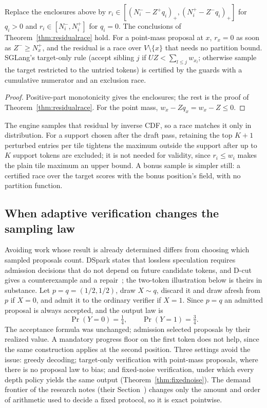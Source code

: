 \begin{theorem}\label{thm:residualself}
Replace the enclosures above by $r_i\in[(N^-_i-Z^+q_i)_+,(N^+_i-Z^-q_i)_+]$ for $q_i>0$ and $r_i\in[N_i^-,N_i^+]$ for $q_i=0$. The conclusions of Theorem~\ref{thm:residualrace} hold. For a point-mass proposal at $x$, $r_x=0$ as soon as $Z^-\ge N^+_x$, and the residual is a race over $V\setminus\{x\}$ that needs no partition bound. SGLang's target-only rule (accept sibling $j$ if $UZ<\sum_{l\le j}w_{x_l}$; otherwise sample the target restricted to the untried tokens) is certified by the guards with a cumulative numerator and an exclusion race.
\end{theorem}
\begin{proof}
Positive-part monotonicity gives the enclosures; the rest is the proof of Theorem~\ref{thm:residualrace}. For the point mass, $w_x-Zq_x=w_x-Z\le0$.
\end{proof}
The engine samples that residual by inverse CDF, so a race matches it only in distribution. For a support chosen after the draft pass, retaining the top $K+1$ perturbed entries per tile tightens the maximum outside the support after up to $K$ support tokens are excluded; it is not needed for validity, since $r_i\le w_i$ makes the plain tile maximum an upper bound. A bonus sample is simpler still: a certified race over the target scores with the bonus position's field, with no partition function.

\subsection{When adaptive verification changes the sampling law}\label{app:stopping}\label{sec:stopping}
Avoiding work whose result is already determined differs from choosing which sampled proposals count. DSpark states that lossless speculation requires admission decisions that do not depend on future candidate tokens, and D-cut gives a counterexample and a repair~\cite{dspark,dcut}; the two-token illustration below is theirs in substance. Let $p=q=(1/2,1/2)$, draw $X\sim q$, discard it and draw afresh from $p$ if $X=0$, and admit it to the ordinary verifier if $X=1$. Since $p=q$ an admitted proposal is always accepted, and the output law is
\begin{equation}
\Pr(Y=0)=\tfrac14,\qquad\Pr(Y=1)=\tfrac34.\label{eq:bias}
\end{equation}
The acceptance formula was unchanged; admission selected proposals by their realized value. A mandatory progress floor on the first token does not help, since the same construction applies at the second position. Three settings avoid the issue: greedy decoding; target-only verification with point-mass proposals, where there is no proposal law to bias; and fixed-noise verification, under which every depth policy yields the same output (Theorem~\ref{thm:fixednoise}). The demand frontier of the research notes (their Section~) changes only the amount and order of arithmetic used to decide a fixed protocol, so it is exact pointwise.


